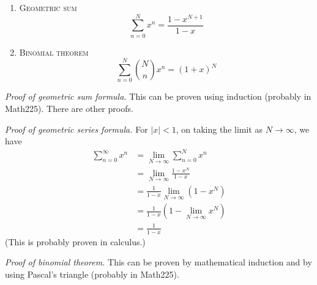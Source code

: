 \begin{enumerate}[nosep]
  \item[]\textsc{Geometric sum}
    \[
      \sum_{n=0}^N x^n = \frac{1 - x^{N+1}}{1 - x}
    \]
  \item[]\textsc{Binomial theorem}
    \[
      \sum_{n=0}^N \binom{N}{n} x^n = (1 + x)^N
    \]
\end{enumerate}

\textit{Proof of geometric sum formula.}
This can be proven using induction (probably in Math225).
There are other proofs.

\textit{Proof of geometric series formula.}
For $|x| < 1$, on taking the limit as $N \rightarrow \infty$, we have
\begin{align*}
  \sum_{n=0}^\infty x^n
  &= \lim_{N \rightarrow \infty} \sum_{n=0}^N x^n \\
  &= \lim_{N \rightarrow \infty} \frac{1 - x^N}{1 - x} \\
  &= \frac{1}{1 - x} \lim_{N \rightarrow \infty} \left(1 - x^N\right) \\
  &= \frac{1}{1 - x} \left(1 - \lim_{N \rightarrow \infty} x^N\right) \\
  &= \frac{1}{1 - x}
\end{align*}
(This is probably proven in calculus.)

\textit{Proof of binomial theorem.}
This can be proven by mathematical induction
and by using Pascal's triangle (probably in Math225).

\newpage
















